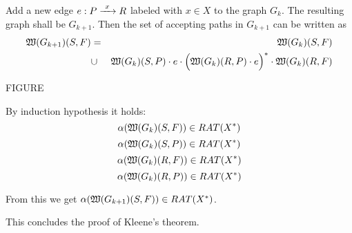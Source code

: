 Add a new edge $e : P \xrightarrow{\ {x}\ } R$ labeled with $x \in X$ to the graph $G_k$. The
resulting graph shall be $G_{k+1}$. Then the set of accepting paths in $G_{k+1}$
can be written as \begin{eqnarray*}
 \mbox{$\mathfrak{W}(G_{k+1})$}(S, F) & = & \mbox{$\mathfrak{W}(G_k)$}(S, F) \\
 & \cup & \mbox{$\mathfrak{W}(G_k)$}(S, P) \cdot e \cdot \Big( \mbox{$\mathfrak{W}(G_k)$}(R, P) \cdot
 e \Big)^* \cdot \mbox{$\mathfrak{W}(G_k)$}(R, F)
\end{eqnarray*}

FIGURE

By induction hypothesis it holds:
\[ \alpha(\mbox{$\mathfrak{W}(G_k)$}(S, F)) \in RAT(X^*) \]
\[ \alpha(\mbox{$\mathfrak{W}(G_k)$}(S, P)) \in RAT(X^*) \]
\[ \alpha(\mbox{$\mathfrak{W}(G_k)$}(R, F)) \in RAT(X^*) \]
\[ \alpha(\mbox{$\mathfrak{W}(G_k)$}(R, P)) \in RAT(X^*) \]

From this we get $\alpha(\mbox{$\mathfrak{W}(G_{k+1})$}(S, F)) \in RAT(X^*)$.

This concludes the proof of Kleene's theorem.



























